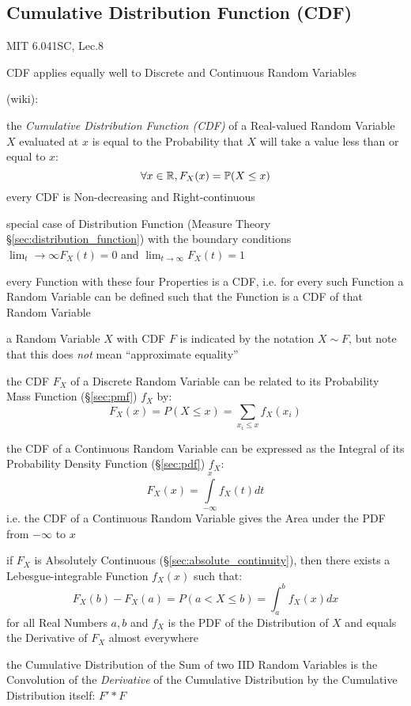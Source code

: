 \subsection{Cumulative Distribution Function (CDF)}\label{sec:cdf}

MIT 6.041SC, Lec.8

CDF applies equally well to Discrete and Continuous Random Variables

(wiki):

the \emph{Cumulative Distribution Function (CDF)} of a Real-valued Random
Variable $X$ evaluated at $x$ is equal to the Probability that $X$ will take a
value less than or equal to $x$:
\[
  \forall x \in \mathbb{R}, F_X(x) = \mathbb{P}(X \leq x)
\]
every CDF is Non-decreasing and Right-continuous

special case of Distribution Function (Measure Theory
\S\ref{sec:distribution_function}) with the boundary conditions
$\lim_t\to\infty F_X(t) = 0$ and $\lim_{t\to\infty}F_X(t) = 1$

every Function with these four Properties is a CDF, i.e. for every such Function
a Random Variable can be defined such that the Function is a CDF of that Random
Variable

a Random Variable $X$ with CDF $F$ is indicated by the notation $X \sim F$, but
note that this does \emph{not} mean ``approximate equality''

the CDF $F_X$ of a Discrete Random Variable can be related to its Probability
Mass Function (\S\ref{sec:pmf}) $f_X$ by:
\[
  F_X(x) = P(X \leq x) = \sum_{x_i \leq x} f_X(x_i)
\]

the CDF of a Continuous Random Variable can be expressed as the Integral of its
Probability Density Function (\S\ref{sec:pdf}) $f_X$:
\[
  F_X(x) = \int\limits_{-\infty}^x f_X(t) dt
\]
i.e. the CDF of a Continuous Random Variable gives the Area under the PDF from
$-\infty$ to $x$

if $F_X$ is Absolutely Continuous (\S\ref{sec:absolute_continuity}), then there
exists a Lebesgue-integrable Function $f_X(x)$ such that:
\[
  F_X(b) - F_X(a) = P(a < X \leq b) = \int_a^b f_X(x) dx
\]
for all Real Numbers $a, b$ and $f_X$ is the PDF of the Distribution of $X$
and equals the Derivative of $F_X$ almost everywhere

the Cumulative Distribution of the Sum of two IID Random Variables is the
Convolution of the \emph{Derivative} of the Cumulative Distribution by the
Cumulative Distribution itself: $F' * F$

